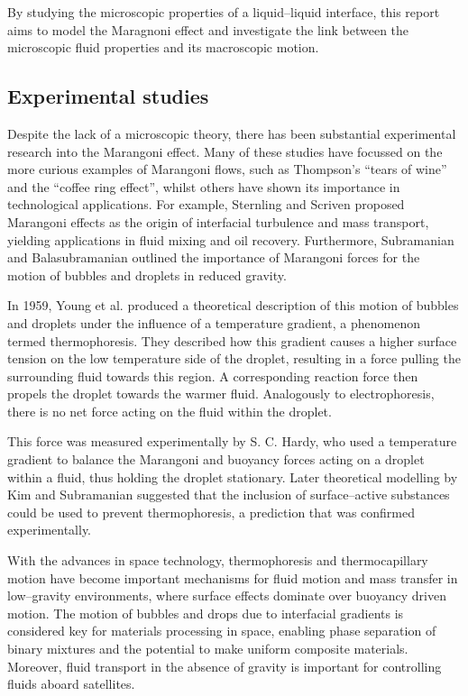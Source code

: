 By studying the microscopic properties of a liquid--liquid interface, this report aims to model the Maragnoni effect and investigate the link between the microscopic fluid properties and its macroscopic motion.

\subsection{Experimental studies}
Despite the lack of a microscopic theory, there has been substantial experimental research into the Marangoni effect.
Many of these studies have focussed on the more curious examples of Marangoni flows, such as Thompson's ``tears of wine''\cite{JThompson,Venerus,Tadmor,Cazabat1995} and the ``coffee ring effect'',\cite{Sefian,HuLarson,Sefiane2014} whilst others have shown its importance in technological applications.
For example, Sternling and Scriven\cite{SternlingScriven} proposed Marangoni effects as the origin of interfacial turbulence and mass transport, yielding applications in fluid mixing and oil recovery.\cite{Aguilera2005,LyfordA,LyfordB} 
Furthermore, Subramanian and Balasubramanian outlined the importance of Marangoni forces for the motion of bubbles and droplets in reduced gravity.\cite{MotionOfBubblesAndDrops} 

In 1959, Young et al. produced a theoretical description of this motion of bubbles and droplets under the influence of a temperature gradient, a phenomenon termed thermophoresis.\cite{Young1959}
They described how this gradient causes a higher surface tension on the low temperature side of the droplet, resulting in a force pulling the surrounding fluid towards this region.
A corresponding reaction force then propels the droplet towards the warmer fluid.
Analogously to electrophoresis, there is no net force acting on the fluid within the droplet.

This force was measured experimentally by S. C. Hardy,\cite{Hardy1978} who used a temperature gradient to balance the Marangoni and buoyancy forces acting on a droplet within a fluid, thus holding the droplet stationary.
Later theoretical modelling by Kim and Subramanian suggested that the inclusion of surface--active substances could be used to prevent thermophoresis,\cite{KimSubramanianA,KimSubramanianB} a prediction that was confirmed experimentally.\cite{BartonSubramanian,ChenStebe}

With the advances in space technology, thermophoresis and thermocapillary motion have become important mechanisms for fluid motion and mass transfer in low--gravity environments, where surface effects dominate over buoyancy driven motion.
The motion of bubbles and drops due to interfacial gradients is considered key for materials processing in space, enabling phase separation of binary mixtures and the potential to make uniform composite materials.\cite{BartonSubramanian}
Moreover, fluid transport in the absence of gravity is important for controlling fluids aboard satellites. 

